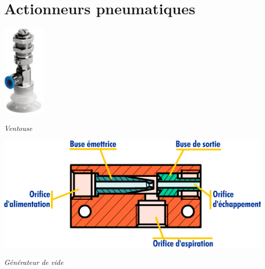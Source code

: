 \documentclass[10pt]{article}
\begin{document}
\section{Actionneurs pneumatiques}

\begin{minipage}[c]{.3\linewidth}
\begin{center}
\includegraphics[width=.5\textwidth]{images/ventouse_festo}

\textit{Ventouse}
\end{center}
\end{minipage}\hfill
\begin{minipage}[c]{.3\linewidth}
\begin{center}
\includegraphics[width=1.5\textwidth]{images/generateur_vide}

\textit{Générateur de vide}
\end{center}
\end{minipage}\hfill
\end{document}
